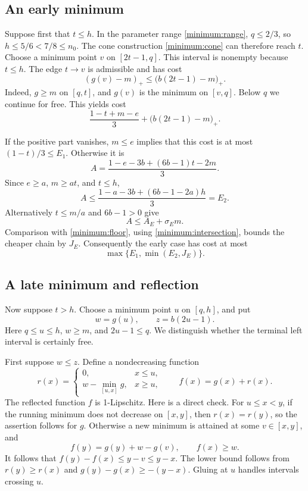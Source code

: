 \subsection{An early minimum}
Suppose first that \(t\le h\). In the parameter range
\eqref{minimum:range}, \(q\le2/3\), so \(h\le5/6<7/8\le n_0\).
The cone construction \eqref{minimum:cone} can therefore reach \(t\).
Choose a minimum point \(v\) on \([2t-1,q]\). This interval is
nonempty because \(t\le h\). The edge \(t\to v\) is admissible
and has cost
\[
 (g(v)-m)_+\le\bigl(b(2t-1)-m\bigr)_+.
\]
Indeed, \(g\ge m\) on \([q,t]\), and \(g(v)\) is the minimum
on \([v,q]\). Below \(q\) we continue for free. This yields cost
\begin{equation}\label{minimum:early-route}
 \frac{1-t+m-e}{3}+\bigl(b(2t-1)-m\bigr)_+.
\end{equation}

If the positive part vanishes, \(m\le e\) implies that this cost
is at most \((1-t)/3\le E_1\). Otherwise it is
\[
 A=\frac{1-e-3b+(6b-1)t-2m}{3}.
\]
Since \(e\ge a\), \(m\ge at\), and \(t\le h\),
\begin{equation}\label{minimum:earlyE2}
 A\le\frac{1-a-3b+(6b-1-2a)h}{3}=E_2.
\end{equation}
Alternatively \(t\le m/a\) and \(6b-1>0\) give
\[
 A\le A_E+\sigma_E m.
\]
Comparison with \eqref{minimum:floor}, using
\eqref{minimum:intersection}, bounds the cheaper chain by \(J_E\).
Consequently the early case has cost at most
\begin{equation}\label{minimum:early-bound}
 \max\{E_1,\min(E_2,J_E)\}.
\end{equation}

\subsection{A late minimum and reflection}
Now suppose \(t>h\). Choose a minimum point \(u\) on \([q,h]\),
and put
\[
 w=g(u),\qquad z=b(2u-1).
\]
Here \(q\le u\le h\), \(w\ge m\), and \(2u-1\le q\).
We distinguish whether the terminal left interval is certainly free.

First suppose \(w\le z\). Define a nondecreasing function
\[
 r(x)=\begin{cases}
 0,&x\le u,\\
 w-\min_{[u,x]}g,&x\ge u,
 \end{cases}
 \qquad f(x)=g(x)+r(x).
\]
The reflected function \(f\) is 1-Lipschitz. Here is a direct check.
For \(u\le x<y\), if the running minimum does not decrease on
\([x,y]\), then \(r(x)=r(y)\), so the assertion follows for \(g\).
Otherwise a new minimum is attained at some \(v\in[x,y]\), and
\[
 f(y)=g(y)+w-g(v),\qquad f(x)\ge w.
\]
It follows that \(f(y)-f(x)\le y-v\le y-x\). The lower bound follows
from \(r(y)\ge r(x)\) and \(g(y)-g(x)\ge-(y-x)\). Gluing at
\(u\) handles intervals crossing \(u\).

